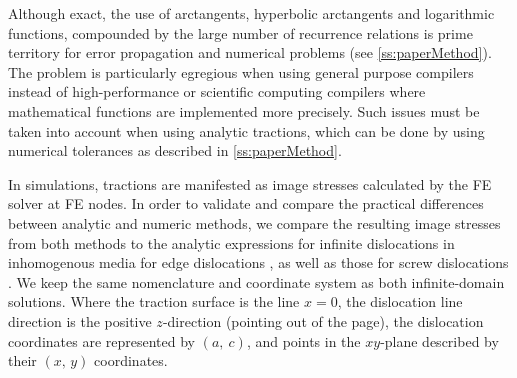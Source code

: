 Although exact, the use of arctangents, hyperbolic arctangents and logarithmic functions, compounded by the large number of recurrence relations is prime territory for error propagation and numerical problems (see \cref{ss:paperMethod}). The problem is particularly egregious when using general purpose compilers instead of high-performance or scientific computing compilers where mathematical functions are implemented more precisely. Such issues must be taken into account when using analytic tractions, which can be done by using numerical tolerances as described in \cref{ss:paperMethod}.

In simulations, tractions are manifested as image stresses calculated by the FE solver at FE nodes. In order to validate and compare the practical differences between analytic and numeric methods, we compare the resulting image stresses from both methods to the analytic expressions for infinite dislocations in inhomogenous media for edge dislocations \cite{head1953edge}, as well as those for screw dislocations \cite[p.~59,~64]{hirth1983theory}. We keep the same nomenclature and coordinate system as both infinite-domain solutions. Where the traction surface is the line $x=0$, the dislocation line direction is the positive $z$-direction (pointing out of the page), the dislocation coordinates are represented by $(a,~c)$, and points in the $xy$-plane described by their $(x,\,y)$ coordinates.

